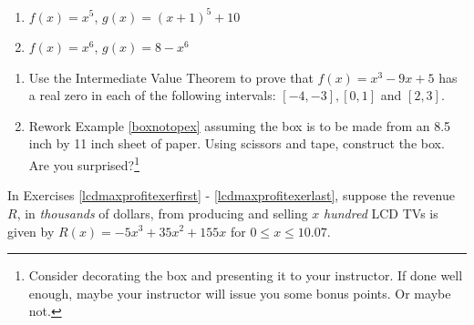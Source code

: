 \begin{multicols}{2}
\begin{enumerate}
\setcounter{enumi}{\value{HW}}

\item $f(x) = x^5$, $g(x) = (x+1)^5+10$
\item $f(x) = x^6$, $g(x) = 8-x^6$ \label{polytranslast}

\setcounter{HW}{\value{enumi}}
\end{enumerate}
\end{multicols}

\begin{enumerate}
\setcounter{enumi}{\value{HW}}

\item Use the Intermediate Value Theorem to prove that $f(x) = x^{3} - 9x + 5$ has a real zero in each of the following intervals: $[-4, -3], [0, 1]$ and $[2, 3]$.

\item  Rework Example \ref{boxnotopex} assuming the box is to be made from an 8.5 inch by 11 inch sheet of paper. Using scissors and tape, construct the box.  Are you surprised?\footnote{Consider decorating the box and presenting it to your instructor. If done well enough, maybe your instructor will issue you some bonus points.  Or maybe not.}

\setcounter{HW}{\value{enumi}}
\end{enumerate}

\label{LCDmaxprofit} 

In Exercises \ref{lcdmaxprofitexerfirst} - \ref{lcdmaxprofitexerlast}, suppose the revenue $R$, in \textit{thousands} of dollars, from producing and selling $x$ \textit{hundred} LCD TVs is given by $R(x) = -5x^3+35x^2+155x$ for $0 \leq x \leq 10.07$.

